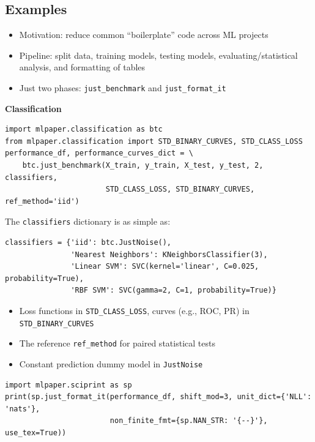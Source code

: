 \documentclass[a0,landscape]{a0poster}
\newcommand{\mysection}[1]{\section*{\fontsize{67.1}{82} \selectfont \color{NavyBlue} #1 \color{Black}}}
\newcommand{\code}{\texttt}
\newcommand{\sectionx}{\textbf}
\begin{document}
\begin{multicols}{2}

\Large

\mysection{Examples}

\begin{itemize}
  \item Motivation: reduce common ``boilerplate'' code across ML projects
  \item Pipeline: split data, training models, testing models, evaluating/statistical analysis, and formatting of tables
  \item Just two phases: \code{just\_benchmark} and \code{just\_format\_it}
\end{itemize}

\sectionx{Classification}
{\normalsize
\begin{verbatim}
import mlpaper.classification as btc
from mlpaper.classification import STD_BINARY_CURVES, STD_CLASS_LOSS
performance_df, performance_curves_dict = \
    btc.just_benchmark(X_train, y_train, X_test, y_test, 2, classifiers,
                       STD_CLASS_LOSS, STD_BINARY_CURVES, ref_method='iid')
\end{verbatim}
}
The \code{classifiers} dictionary is as simple as:
{\normalsize
\begin{verbatim}
classifiers = {'iid': btc.JustNoise(),
               'Nearest Neighbors': KNeighborsClassifier(3),
               'Linear SVM': SVC(kernel='linear', C=0.025, probability=True),
               'RBF SVM': SVC(gamma=2, C=1, probability=True)}
\end{verbatim}
}
\begin{itemize}
  \item Loss functions in \code{STD\_CLASS\_LOSS}, curves (e.g., ROC, PR) in \code{STD\_BINARY\_CURVES}
  \item The reference \code{ref\_method} for paired statistical tests
  \item Constant prediction dummy model in \code{JustNoise}
\end{itemize}
{\normalsize
\begin{verbatim}
import mlpaper.sciprint as sp
print(sp.just_format_it(performance_df, shift_mod=3, unit_dict={'NLL': 'nats'},
                        non_finite_fmt={sp.NAN_STR: '{--}'}, use_tex=True))
\end{verbatim}
}
\begin{center}
{\footnotesize
\setlength{\tabcolsep}{0.75em} %
\begin{tabular}{|l|l|r|l|r|l|r|l|r|l|r|l|r|l|r|}

\end{tabular}}
\end{center}
\end{multicols}
\end{document}
